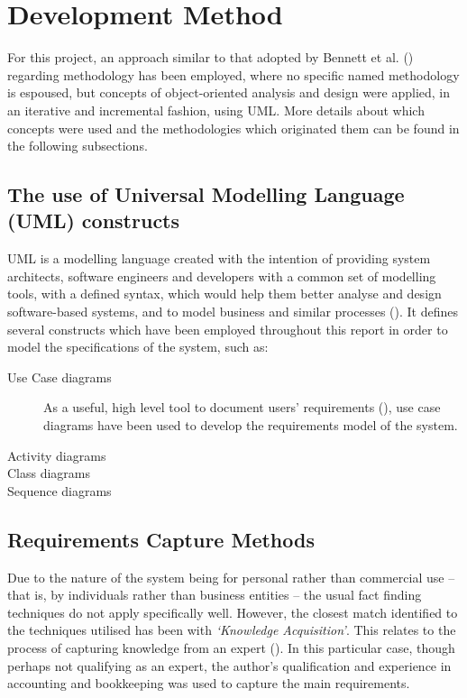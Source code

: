 \section{Development Method} \label{sec:DevelopmentMethod}
For this project, an approach similar to that adopted by Bennett et al.
(\citeyear[][p.~77]{bennett2010object}) regarding methodology has been
employed, where no specific named methodology is espoused, but concepts of
object-oriented analysis and design were applied, in an iterative and
incremental fashion, using UML. More details about which concepts were used and
the methodologies which originated them can be found in the following
subsections.

\subsection{The use of Universal Modelling Language (UML) constructs}
\label{sec:Introduction.methodology.uml}

UML is a modelling language created with the intention of providing system
architects, software engineers and developers with a common set of modelling
tools, with a defined syntax, which would help them better analyse and design
software-based systems, and to model business and similar processes
(\cite[][p.~43]{omg2015uml}). It defines several constructs which have been
employed throughout this report in order to model the specifications of the
system, such as:
\begin{description}
  \item[Use Case diagrams]
    As a useful, high level tool to document users' requirements
    (\cite[][p.~138]{bennett2010object}), use case diagrams have been used to
    develop the requirements model of the system.

  \item[Activity diagrams]

  \item[Class diagrams]
    
  \item[Sequence diagrams]
\end{description}


\subsection{Requirements Capture Methods} \label{sec:DevelopmentMethod.RequirementsCapture}
Due to the nature of the system being for personal rather than commercial use
-- that is, by individuals rather than business entities -- the usual fact
finding techniques do not apply specifically well. However, the closest match
identified to the techniques utilised has been with \emph{`Knowledge
Acquisition'}. This relates to the process of capturing knowledge from an
expert (\cite[][p.~150]{bennett2010object}). In this particular case, though
perhaps not qualifying as an expert, the author's qualification and experience
in accounting and bookkeeping was used to capture the main requirements.

